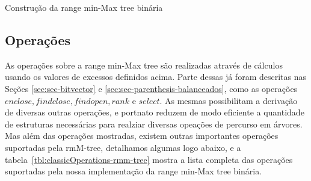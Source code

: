 \begin{algorithm}[h!]


    \caption{Construção da range min-Max tree binária}
    \label{alg:build-bin-tree}
\end{algorithm}

\subsection{Operações}
As operações sobre a range min-Max tree são realizadas através de cálculos usando os valores de excessos definidos acima. 
Parte dessas já foram descritas nas Seções \ref{sec:sec-bitvector} e \ref{sec:sec-parenthesis-balanceados}, como as operações  $enclose, findclose, findopen, rank \mbox{ e } select$.
As mesmas possibilitam a derivação de diversas outras operações, e portnato reduzem de modo eficiente a quantidade de estruturas
necessárias para realziar diversas opeações de percurso em árvores.
Mas além das operações mostradas, existem outras importantes operações suportadas pela rmM-tree, detalhamos algumas logo abaixo, e
a tabela~\ref{tbl:classicOperations-rmm-tree} mostra a lista completa das operações suportadas pela nossa implementação da range min-Max tree binária.

